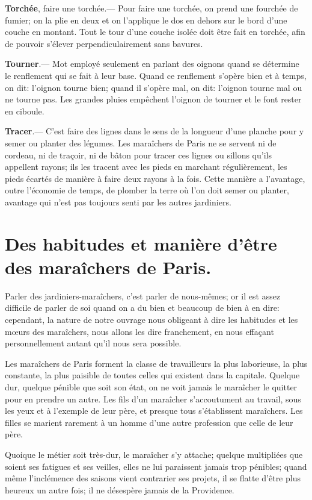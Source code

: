 \documentclass[10pt,a4paper]{book}
\begin{document}
\textbf{Torchée}, faire une torchée.--- Pour faire une torchée, on prend une fourchée de fumier; on la plie en deux et on l'applique le dos en dehors sur le bord d'une couche en montant. Tout le tour d'une couche isolée doit être fait en torchée, afin de pouvoir s'élever perpendiculairement sans bavures.

\textbf{Tourner}.--- Mot employé seulement en parlant des oignons quand se détermine le renflement qui se fait à leur base. Quand ce renflement s'opère bien et à temps, on dit: l'oignon tourne bien; quand il s'opère mal, on dit: l'oignon tourne mal ou ne tourne pas. Les grandes pluies empêchent l'oignon de tourner et le font rester en ciboule.

\textbf{Tracer}.--- C'est faire des lignes dans le sens de la longueur d'une planche pour y semer ou planter des légumes. Les maraîchers de Paris ne se servent ni de cordeau, ni de traçoir, ni de bâton pour tracer ces lignes ou sillons qu'ils appellent rayons; ils les tracent avec les pieds en marchant régulièrement, les pieds écartés de manière à faire deux rayons à la fois. Cette manière a l'avantage, outre l'économie de temps, de plomber la terre où l'on doit semer ou planter, avantage qui n'est pas toujours senti par les autres jardiniers.

\chapter{Des habitudes et manière d'être des maraîchers de Paris.}

Parler des jardiniers-maraîchers, c'est parler de nous-mêmes; or il est assez difficile de parler de soi quand on a du bien et beaucoup de bien à en dire: cependant, la nature de notre ouvrage nous obligeant à dire les habitudes et les mœurs des maraîchers, nous allons les dire franchement, en nous effaçant personnellement autant qu'il nous sera possible.

Les maraîchers de Paris forment la classe de travailleurs la plus laborieuse, la plus constante, la plus paisible de toutes celles qui existent dans la capitale. Quelque dur, quelque pénible que soit son état, on ne voit jamais le maraîcher le quitter pour en prendre un autre. Les fils d'un maraîcher s'accoutument au travail, sous les yeux et à l'exemple de leur père, et presque tous s'établissent maraîchers. Les filles se marient rarement à un homme d'une autre profession que celle de leur père.

Quoique le métier soit très-dur, le maraîcher s'y attache; quelque multipliées que soient ses fatigues et ses veilles, elles ne lui paraissent jamais trop pénibles; quand même l'inclémence des saisons vient contrarier ses projets, il se flatte d'être plus heureux un autre fois; il ne désespère jamais de la Providence.
\end{document}
